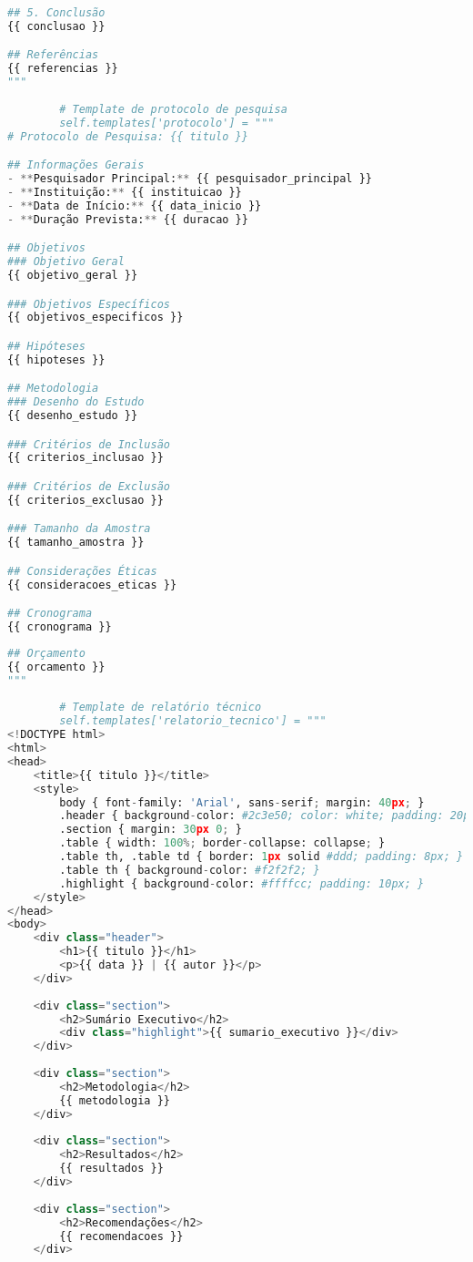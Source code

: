 \begin{pythonbox}
\begin{lstlisting}[language=Python]       
## 5. Conclusão
{{ conclusao }}

## Referências
{{ referencias }}
"""
        
        # Template de protocolo de pesquisa
        self.templates['protocolo'] = """
# Protocolo de Pesquisa: {{ titulo }}

## Informações Gerais
- **Pesquisador Principal:** {{ pesquisador_principal }}
- **Instituição:** {{ instituicao }}
- **Data de Início:** {{ data_inicio }}
- **Duração Prevista:** {{ duracao }}

## Objetivos
### Objetivo Geral
{{ objetivo_geral }}

### Objetivos Específicos
{{ objetivos_especificos }}

## Hipóteses
{{ hipoteses }}

## Metodologia
### Desenho do Estudo
{{ desenho_estudo }}

### Critérios de Inclusão
{{ criterios_inclusao }}

### Critérios de Exclusão
{{ criterios_exclusao }}

### Tamanho da Amostra
{{ tamanho_amostra }}

## Considerações Éticas
{{ consideracoes_eticas }}

## Cronograma
{{ cronograma }}
   \end{lstlisting}
\end{pythonbox}

\begin{pythonbox}
\begin{lstlisting}[language=Python]       
## Orçamento
{{ orcamento }}
"""
        
        # Template de relatório técnico
        self.templates['relatorio_tecnico'] = """
<!DOCTYPE html>
<html>
<head>
    <title>{{ titulo }}</title>
    <style>
        body { font-family: 'Arial', sans-serif; margin: 40px; }
        .header { background-color: #2c3e50; color: white; padding: 20px; }
        .section { margin: 30px 0; }
        .table { width: 100%; border-collapse: collapse; }
        .table th, .table td { border: 1px solid #ddd; padding: 8px; }
        .table th { background-color: #f2f2f2; }
        .highlight { background-color: #ffffcc; padding: 10px; }
    </style>
</head>
<body>
    <div class="header">
        <h1>{{ titulo }}</h1>
        <p>{{ data }} | {{ autor }}</p>
    </div>
    
    <div class="section">
        <h2>Sumário Executivo</h2>
        <div class="highlight">{{ sumario_executivo }}</div>
    </div>
    
    <div class="section">
        <h2>Metodologia</h2>
        {{ metodologia }}
    </div>
    
    <div class="section">
        <h2>Resultados</h2>
        {{ resultados }}
    </div>
    
    <div class="section">
        <h2>Recomendações</h2>
        {{ recomendacoes }}
    </div>
       \end{lstlisting}
\end{pythonbox}

